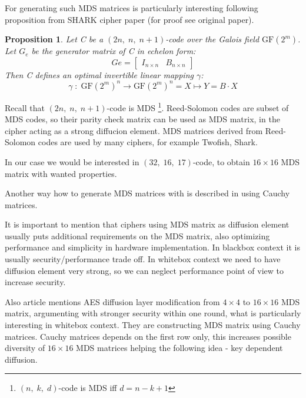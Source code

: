 \documentclass[11pt,oneside,final]{fithesis2}
\newtheorem{myprop}{Proposition}
\begin{document}
    For generating such MDS matrices is particularly interesting following proposition from SHARK cipher paper \citep{shark96} (for proof see
    original paper).
    
    \begin{myprop}
	Let C be a $(2n,\; n,\; n+1)$-code over the Galois field $\text{GF}(2^m)$. Let $G_e$  be the generator matrix of C in echelon form:
	\begin{equation}
	   Ge = \begin{bmatrix} I_{n \times n} & B_{n \times n}\end{bmatrix}
	\end{equation}
	Then C defines an optimal invertible linear mapping $\gamma$:
	\begin{equation}
	   \gamma \; : \; \text{GF}(2^m)^n \rightarrow \text{GF}(2^m)^n = X \mapsto Y = B \cdot X
	\end{equation}
    \end{myprop}
    
    Recall that $(2n,\; n,\; n+1)$-code is MDS \footnote{$(n,\;k,\;d)$-code is MDS iff $d=n-k+1$}. Reed-Solomon codes are subset of MDS codes, so their 
    parity check matrix can be used as MDS matrix, in the cipher acting as a strong diffucion element. MDS matrices derived from Reed-Solomon codes are used by many 
    ciphers, for example Twofish, Shark. 

    In our case we would be interested in $(32,\;16,\;17)$-code, to obtain $16 \times 16$ MDS matrix with wanted properties.
    
    Another way how to generate MDS matrices with is described in \citep{Roth:1985:GMM:7030.7044} using Cauchy matrices. 

    It is important to mention that ciphers using MDS matrix as diffusion element usually puts additional requirements on the MDS matrix, also optimizing
    performance and simplicity in hardware implementation. In blackbox context it is usually security/performance trade off. In whitebox context we need
    to have diffusion element very strong, so we can neglect performance point of view to increase security.
    
    Also article \cite{mds_aes} mentions AES diffusion layer modification from $4 \times 4$ to $16 \times 16$ MDS matrix, argumenting with 
    stronger security within one round, what is particularly interesting in whitebox context. They are constructing MDS matrix using Cauchy matrices. Cauchy matrices
    depends on the first row only, this increases possible diversity of $16 \times 16$ MDS matrices helping the following idea - key dependent diffusion.
\end{document}
